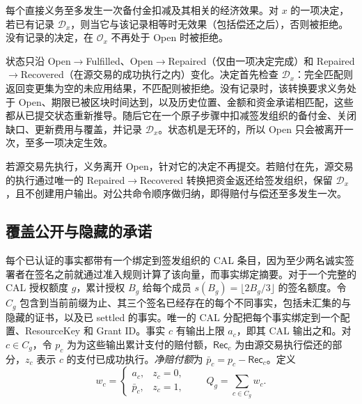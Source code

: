\begin{lemma}[赔付至多生效一次]
\label{lem:security-decision}
每个直接义务至多发生一次备付金扣减及其相关的经济效果。对 $x$ 的一项决定，若已有记录 $\mathcal D_x$，则当它与该记录相等时无效果（包括偿还之后），否则被拒绝。没有记录的决定，在 $\mathcal O_x$ 不再处于 Open 时被拒绝。
\end{lemma}
\begin{IEEEproof}
状态只沿 Open$\to$Fulfilled、Open$\to$Repaired（仅由一项决定完成）和 Repaired$\to$Recovered（在源交易的成功执行之内）变化。决定首先检查 $\mathcal D_x$：完全匹配则返回变更集为空的未应用结果，不匹配则被拒绝。没有记录时，该转换要求义务处于 Open、期限已被区块时间达到，以及历史位置、金额和资金承诺相匹配，这些都从已提交状态重新推导。随后它在一个原子步骤中扣减签发组织的备付金、关闭缺口、更新费用与覆盖，并记录 $\mathcal D_x$。状态机是无环的，所以 Open 只会被离开一次，至多一项决定生效。

若源交易先执行，义务离开 Open，针对它的决定不再提交。若赔付在先，源交易的执行通过唯一的 Repaired$\to$Recovered 转换把资金返还给签发组织，保留 $\mathcal D_x$，且不创建用户输出。对公共命令顺序做归纳，即得赔付与偿还至多发生一次。
\end{IEEEproof}

\subsection{覆盖公开与隐藏的承诺}
\label{sec:security-coverage}

每个已认证的事实都带有一个绑定到签发组织的 CAL 条目，因为至少两名诚实签署者在签名之前就通过准入规则计算了该向量，而事实绑定摘要。对于一个完整的 CAL 授权额度 $g$，累计授权 $B_g$ 给每个成员 $s(B_g)=\lfloor2B_g/3\rfloor$ 的签名额度。令 $C_g$ 包含到当前前缀为止、其三个签名已经存在的每个不同事实，包括未汇集的与隐藏的证书，以及已 settled 的事实。唯一的 CAL 分配把每个事实绑定到一个配置、ResourceKey 和 Grant ID。事实 $c$ 有输出上限 $a_c$，即其 CAL 输出之和。对 $c\in C_g$，令 $p_c$ 为为这些输出累计支付的赔付额，$\mathsf{Rec}_c$ 为由源交易执行偿还的部分，$z_c$ 表示 $c$ 的支付已成功执行。\emph{净赔付额}为 $\bar p_c=p_c-\mathsf{Rec}_c$。定义
\begin{equation}
  w_c=\begin{cases}a_c,&z_c=0,\\\bar p_c,&z_c=1,\end{cases}
  \qquad Q_g=\sum_{c\in C_g}w_c.
  \label{eq:security-risk}
\end{equation}


